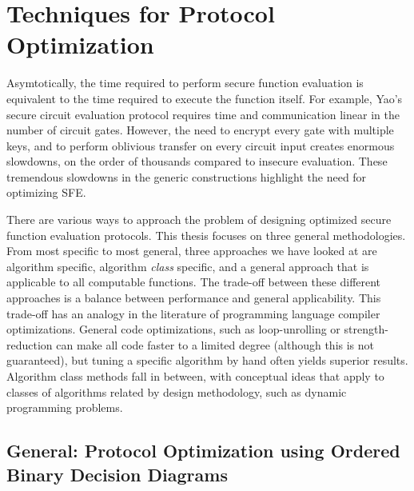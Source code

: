 
\chapter{Techniques for Protocol Optimization}\label{sec:Techniques}

Asymtotically, the time required to perform secure function evaluation
is equivalent to the time required to execute the function itself.
For example, Yao's secure circuit evaluation protocol \cite{Yao86}
requires time and communication linear in the number of circuit gates.
However, the need to encrypt every gate with multiple keys, and to
perform oblivious transfer on every circuit input creates enormous
slowdowns, on the order of thousands compared to insecure evaluation.
These tremendous slowdowns in the generic constructions highlight
the need for optimizing SFE.

There are various ways to approach the problem of designing optimized
secure function evaluation protocols.  This thesis focuses
on three general methodologies. From most specific to most general,
three approaches we have looked at are algorithm specific, algorithm
\emph{class} specific, and a general approach that is applicable to
all computable functions. The trade-off between these different approaches
is a balance between performance and general applicability. This trade-off
has an analogy in the literature of programming language compiler
optimizations. General code optimizations, such as loop-unrolling
or strength-reduction can make all code faster to a limited degree
(although this is not guaranteed), but tuning a specific algorithm
by hand often yields superior results. Algorithm class methods fall
in between, with conceptual ideas that apply to classes of algorithms
related by design methodology, such as dynamic programming problems.


\section{General: Protocol Optimization using Ordered Binary Decision Diagrams}
\label{OBDD-section}

